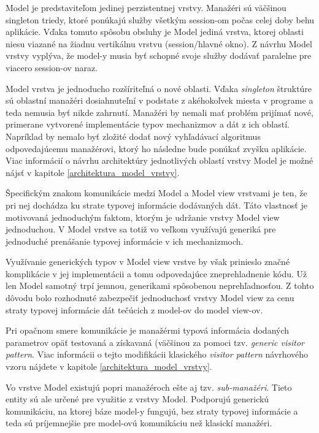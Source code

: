 Model je predstaviteľom jedinej perzistentnej  vrstvy. Manažéri sú väčšinou singleton triedy, ktoré ponúkajú služby všetkým session-om počas celej doby behu aplikácie. Vďaka tomuto spôsobu obsluhy je Model jediná vrstva, ktorej oblasti niesu viazané na žiadnu vertikálnu vrstvu (session/hlavné okno). Z návrhu Model vrstvy vyplýva, že model-y musia byť schopné svoje služby dodávať paralelne pre viacero session-ov naraz. 

Model vrstva je jednoducho rozšíriteľná o nové oblasti. Vďaka \textit{singleton} štruktúre sú oblastní manažéri dosiahnuteľní v podstate z akéhokoľvek miesta v programe a teda nemusia byť nikde zahrnutí. Manažéri by nemali mať problém prijímať nové, primerane vytvorené implementácie typov mechanizmov a dát z ich oblastí. Napríklad by nemalo byť zložité dodať nový vyhľadávací algoritmus odpovedajúcemu manažérovi, ktorý ho následne bude ponúkať zvyšku aplikácie. Viac informácií o návrhu architektúry jednotlivých oblastí vrstvy Model je možné nájsť v kapitole \ref{architektura_model_vrstvy}.

Špecifickým znakom komunikácie medzi Model a Model view vrstvami je ten, že pri nej dochádza ku strate typovej informácie dodávaných dát. Táto vlastnosť je motivovaná jednoduchým faktom, ktorým je udržanie vrstvy Model view jednoduchou. V Model vrstve sa totiž vo veľkom využívajú generiká pre jednoduché prenášanie typovej informácie v ich mechanizmoch. 

Využívanie generických typov v Model view vrstve by však prinieslo značné komplikácie v jej implementácii a tomu odpovedajúce zneprehladnenie kódu. Už len Model samotný trpí jemnou, generikami spôsobenou neprehľadnosťou. Z tohto dôvodu bolo rozhodnuté zabezpečiť jednoduchosť vrstvy Model view za cenu straty typovej informácie dát tečúcich z model-ov do model view-ov. 

Pri opačnom smere komunikácie je manažérmi typová informácia dodaných parametrov opäť testovaná a získavaná (väčšinou za pomoci tzv. \textit{generic visitor pattern}. Viac informácii o tejto modifikácii klasického \textit{visitor pattern} návrhového vzoru nájdete v kapitole \ref{architektura_model_vrstvy}.

Vo vrstve Model existujú popri manažéroch ešte aj tzv. \textit{sub-manažéri}. Tieto entity sú ale určené pre využitie z vrstvy Model. Podporujú generickú komunikáciu, na ktorej báze model-y fungujú, bez straty typovej informácie a teda sú príjemnejšie pre model-ovú komunikáciu než klasickí manažéri.     

